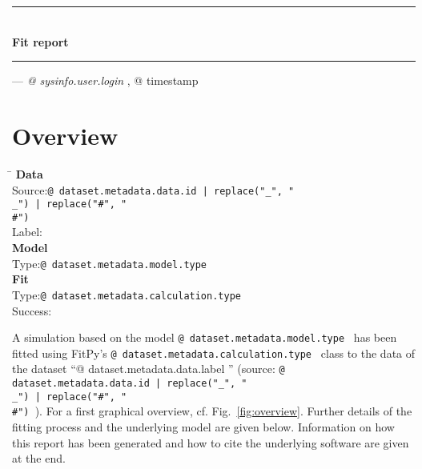 

\thispagestyle{empty}
\rule[1ex]{\textwidth}{1pt}
\\[1em]
\textbf{\LARGE Fit report}
\\[1ex]
\rule{\textwidth}{1pt}

\hfill --- \textsl{{@ sysinfo.user.login }}, {@ timestamp }

\section{Overview}

\begin{tabbing}
\hspace*{1.5cm}\=\kill
\textbf{Data}\\
Source:\>\texttt{{@ dataset.metadata.data.id | replace("_", "\\_") | replace("#", "\\#") }}
\\
Label:
\\[1ex]
\textbf{Model}\\
Type:\>\texttt{{@ dataset.metadata.model.type }}
\\[1ex]
\textbf{Fit}\\
Type:\>\texttt{{@ dataset.metadata.calculation.type }}
\\
Success:\>%
\end{tabbing}

A simulation based on the model \texttt{{@ dataset.metadata.model.type }} has been
fitted using FitPy's \texttt{{@ dataset.metadata.calculation.type }} class to the data of the dataset \enquote{{@ dataset.metadata.data.label }} (source: \texttt{{@ dataset.metadata.data.id | replace("_", "\\_") | replace("#", "\\#") }}). For a first graphical overview, cf. Fig.~\ref{fig:overview}. Further details of the fitting process and the underlying model are given below. Information on how this report has been generated and how to cite the underlying software are given at the end.


